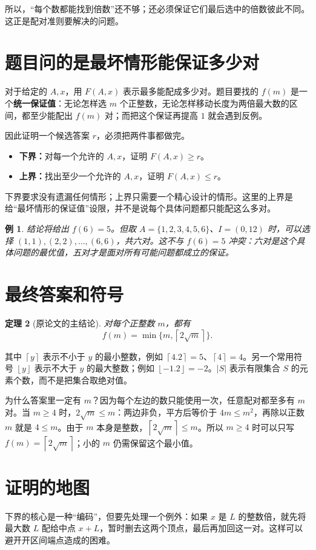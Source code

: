 \documentclass[UTF8,a4paper,oneside,openany,fontset=fandol,zihao=-4]{ctexbook}
\theoremstyle{guide}
\newtheorem{theorem}{定理}[chapter]
\newtheorem{example}[theorem]{例}
\newcommand{\ceil}[1]{\left\lceil#1\right\rceil}
\newcommand{\floor}[1]{\left\lfloor#1\right\rfloor}
\begin{document}
所以，“每个数都能找到倍数”还不够；还必须保证它们最后选中的倍数彼此不同。这正是配对准则要解决的问题。

\section{题目问的是最坏情形能保证多少对}
对于给定的 $A,x$，用 $F(A,x)$ 表示最多能配成多少对。题目要找的 $f(m)$ 是一个\textbf{统一保证值}：无论怎样选 $m$ 个正整数，无论怎样移动长度为两倍最大数的区间，都至少能配出 $f(m)$ 对；而把这个保证再提高 $1$ 就会遇到反例。

因此证明一个候选答案 $r$，必须把两件事都做完。
\begin{itemize}
\item \textbf{下界：}对每一个允许的 $A,x$，证明 $F(A,x)\ge r$。
\item \textbf{上界：}找出至少一个允许的 $A,x$，证明 $F(A,x)\le r$。
\end{itemize}
下界要求没有遗漏任何情形；上界只需要一个精心设计的情形。这里的上界是给“最坏情形的保证值”设限，并不是说每个具体问题都只能配这么多对。

\begin{example}
结论将给出 $f(6)=5$。但取 $A=\{1,2,3,4,5,6\}$、$I=(0,12)$ 时，可以选择 $(1,1),(2,2),\ldots,(6,6)$，共六对。这不与 $f(6)=5$ 冲突：六对是这个具体问题的最优值，五对才是面对所有可能问题都成立的保证。
\end{example}

\section{最终答案和符号}
\begin{theorem}[原论文的主结论]\label{thm:main}
对每个正整数 $m$，都有
\[
\boxed{f(m)=\min\{m,\ceil{2\sqrt m}\}.}
\]
\end{theorem}
其中 $\ceil y$ 表示不小于 $y$ 的最小整数，例如 $\ceil{4.2}=5$、$\ceil4=4$。另一个常用符号 $\floor y$ 表示不大于 $y$ 的最大整数；例如 $\floor{-1.2}=-2$。$|S|$ 表示有限集合 $S$ 的元素个数，而不是把集合取绝对值。

为什么答案里一定有 $m$？因为每个左边的数只能使用一次，任意配对都至多有 $m$ 对。当 $m\ge4$ 时，$2\sqrt m\le m$：两边非负，平方后等价于 $4m\le m^2$，再除以正数 $m$ 就是 $4\le m$。由于 $m$ 本身是整数，$\ceil{2\sqrt m}\le m$。所以 $m\ge4$ 时可以只写 $f(m)=\ceil{2\sqrt m}$；小的 $m$ 仍需保留这个最小值。

\section{证明的地图}
下界的核心是一种“编码”，但要先处理一个例外：如果 $x$ 是 $L$ 的整数倍，就先将最大数 $L$ 配给中点 $x+L$，暂时删去这两个顶点，最后再加回这一对。这样可以避开开区间端点造成的困难。
\end{document}
